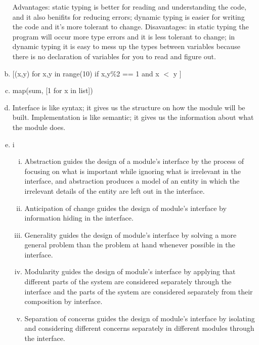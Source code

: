 \documentclass[12pt]{article}
\begin{document}
\begin{enumerate}[a)]
Advantages: static typing is better for reading and understanding the code, and it also benifits for reducing errors; dynamic typing is easier for writing the code and it's more tolerant to change. Disavantages: in static typing the program will occur more type errors and it is less tolerant to change; in dynamic typing it is easy to mess up the types between variables because there is no declaration of variables for you to read and figure out.
\item $[$(x,y) for x,y in range(10) if x,y\%2 == 1 and x $<$ y $]$
\item map(sum, [1 for x in list])
\item Interface is like syntax; it gives us the structure on how the module will be built. Implementation is like semantic; it gives us the information about what the module does.
\item i
	\begin{enumerate}[i)]
	\item Abstraction guides the design of a module's interface by the process of focusing on what is important while ignoring what is irrelevant in the interface, and abstraction produces a model of an entity in which the irrelevant details of the entity are left out in the interface.
	\item Anticipation of change guides the design of module's interface by information hiding in the interface.
	\item Generality guides the design of module's interface by solving a more general problem than the problem at hand whenever possible in the interface.
	\item Modularity guides the design of module's interface by applying that different parts of the system are considered separately through the interface and the parts of the system are considered separately from their composition by interface.
	\item Separation of concerns guides the design of module's interface by isolating and considering different concerns separately in different modules through the interface.
	\end{enumerate}
\end{enumerate}


\newpage

\lstset{language=Python, basicstyle=\tiny, breaklines=true, showspaces=false,
  showstringspaces=false, breakatwhitespace=true}

\def\thesection{\Alph{section}}
\end{document}
